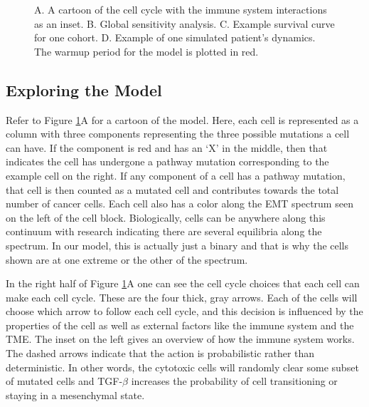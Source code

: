 \documentclass{article}
\begin{document}
\begin{figure}[H]
\center
{}
\caption{A. A cartoon of the cell cycle with the immune system interactions as an inset.
B. Global sensitivity analysis.
C. Example survival curve for one cohort.
D. Example of one simulated patient's dynamics. The warmup period for the model is plotted in red.}
\label{fig:ModelIntro}
\end{figure}

\subsection{Exploring the Model}\label{ExplModel}
Refer to Figure \ref{fig:ModelIntro}A for a cartoon of the model.
Here, each cell is represented as a column with three components representing the three possible mutations a cell can have.
If the component is red and has an `X' in the middle, then that indicates the cell has undergone a pathway mutation corresponding to the example cell on the right.
If any component of a cell has a pathway mutation, that cell is then counted as a mutated cell and contributes towards the total number of cancer cells.
Each cell also has a color along the EMT spectrum seen on the left of the cell block. 
Biologically, cells can be anywhere along this continuum with research indicating there are several equilibria along the spectrum.
In our model, this is actually just a binary and that is why the cells shown are at one extreme or the other of the spectrum.

In the right half of Figure \ref{fig:ModelIntro}A one can see the cell cycle choices that each cell can make each cell cycle.
These are the four thick, gray arrows.
Each of the cells will choose which arrow to follow each cell cycle, and this decision is influenced by the properties of the cell as well as external factors like the immune system and the TME.
The inset on the left gives an overview of how the immune system works.
The dashed arrows indicate that the action is probabilistic rather than deterministic.
In other words, the cytotoxic cells will randomly clear some subset of mutated cells and TGF-$\beta$ increases the probability of cell transitioning or staying in a mesenchymal state.
\end{document}
